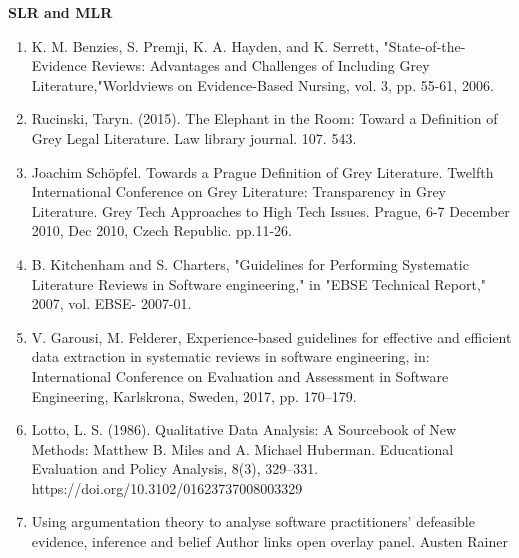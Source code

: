 \documentclass[english, 12pt, a4paper, sci, utf8, a-1b, online]{aaltothesis}
\begin{document}
\textbf{SLR and MLR}
\begin{enumerate}
  \item K. M. Benzies, S. Premji, K. A. Hayden, and K. Serrett, "State-of-the-Evidence Reviews: Advantages and Challenges of Including Grey Literature,"Worldviews on Evidence-Based Nursing, vol. 3, pp. 55-61, 2006.
  \item Rucinski, Taryn. (2015). The Elephant in the Room: Toward a Definition of Grey Legal Literature. Law library journal. 107. 543.
  \item Joachim Schöpfel. Towards a Prague Definition of Grey Literature. Twelfth International Conference on Grey Literature: Transparency in Grey Literature. Grey Tech Approaches to High Tech Issues. Prague, 6-7 December 2010, Dec 2010, Czech Republic. pp.11-26.
  \item B. Kitchenham and S. Charters, "Guidelines for Performing Systematic Literature Reviews in Software engineering," in "EBSE Technical Report," 2007, vol. EBSE- 2007-01.
  \item V. Garousi, M. Felderer, Experience-based guidelines for effective and efficient data extraction in systematic reviews in software engineering, in: International Conference on Evaluation and Assessment in Software Engineering, Karlskrona, Sweden, 2017, pp. 170–179.
  \item Lotto, L. S. (1986). Qualitative Data Analysis: A Sourcebook of New Methods: Matthew B. Miles and A. Michael Huberman. Educational Evaluation and Policy Analysis, 8(3), 329–331. https://doi.org/10.3102/01623737008003329
  \item Using argumentation theory to analyse software practitioners’ defeasible evidence, inference and belief
        Author links open overlay panel. Austen Rainer
\end{enumerate}
\end{document}
